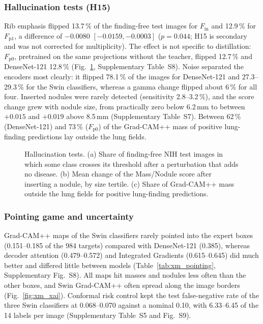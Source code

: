 \subsubsection{Hallucination tests (H15)}
Rib emphasis flipped 13.7\,\% of the finding-free test images for $F_{\mathrm{in}}$ and 12.9\,\% for $F_{\mathrm{p1}}$, a difference of
$-0.0080$ $[-0.0159, -0.0003]$ ($p=0.044$; H15 is secondary and was not corrected for multiplicity). The effect is not specific to
distillation: $F_{\mathrm{p0}}$, pretrained on the same projections without the teacher, flipped 12.7\,\% and DenseNet-121 12.8\,\%
(Fig.~\ref{fig:xm_halluc}, Supplementary Table~S8). Noise separated the encoders most clearly: it flipped 78.1\,\% of the images for
DenseNet-121 and 27.3--29.3\,\% for the Swin classifiers, whereas a gamma change flipped about 6\,\% for all four. Inserted nodules were
rarely detected (sensitivity 2.8--3.2\,\%), and the score change grew with nodule size, from practically zero below 6.2\,mm to between
$+0.015$ and $+0.019$ above 8.5\,mm (Supplementary Table~S7). Between 62\,\% (DenseNet-121) and 73\,\% ($F_{\mathrm{p0}}$) of the
Grad-CAM++ mass of positive lung-finding predictions lay outside the lung fields.

\begin{figure}[!t]
\centering
{}
\caption{Hallucination tests. (a) Share of finding-free NIH test images in which some class crosses its threshold after a perturbation that
adds no disease. (b) Mean change of the Mass/Nodule score after inserting a nodule, by size tertile. (c) Share of Grad-CAM++ mass outside
the lung fields for positive lung-finding predictions.}
\label{fig:xm_halluc}
\end{figure}

\subsubsection{Pointing game and uncertainty}
Grad-CAM++ maps of the Swin classifiers rarely pointed into the expert boxes (0.151--0.185 of the 984 targets) compared with DenseNet-121
(0.385), whereas decoder attention (0.479--0.572) and Integrated Gradients (0.615--0.645) did much better and differed little between models
(Table~\ref{tab:xm_pointing}, Supplementary Fig.~S8). All maps hit masses and nodules less often than the other boxes, and Swin Grad-CAM++
often spread along the image borders (Fig.~\ref{fig:xm_xai}). Conformal risk control kept the test false-negative rate of the three Swin
classifiers at 0.068--0.070 against a nominal 0.10, with 6.33--6.45 of the 14 labels per image (Supplementary Table~S5 and Fig.~S9).

